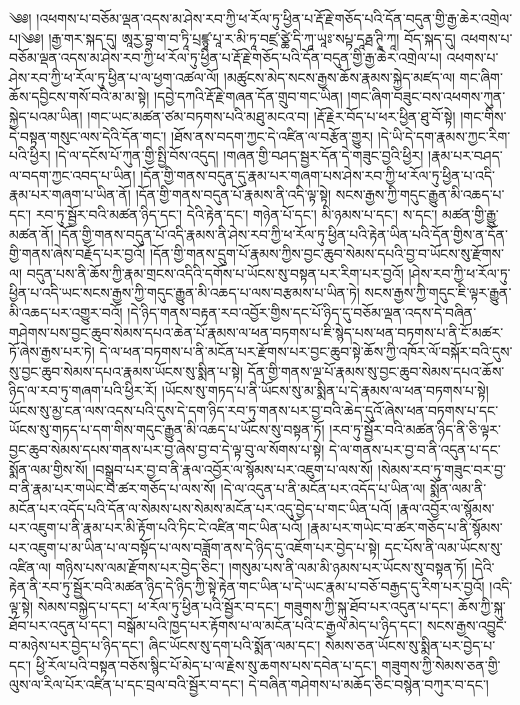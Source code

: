 \setcounter{footnote}{0} 
༄༅། །འཕགས་པ་བཅོམ་ལྡན་འདས་མ་ཤེས་རབ་ཀྱི་ཕ་རོལ་ཏུ་ཕྱིན་པ་རྡོ་རྗེ་གཅོད་པའི་དོན་བདུན་གྱི་རྒྱ་ཆེར་འགྲེལ་པ།༄༅། །རྒྱ་གར་སྐད་དུ། ཨཱརྱ་བྷ་ག་བ་ཏཱི་པྲཛྙཱ་པཱ་ར་མི་ཏཱ་བཛྲ་ཙྪེ་དི་ཀཱ་ཡཱཿ་སཔྟ་དཱརྠ་ཊཱི་ཀཱ། བོད་སྐད་དུ། འཕགས་པ་བཅོམ་ལྡན་འདས་མ་ཤེས་རབ་ཀྱི་ཕ་རོལ་ཏུ་ཕྱིན་པ་རྡོ་རྗེ་གཅོད་པའི་དོན་བདུན་གྱི་རྒྱ་ཆེར་འགྲེལ་པ། འཕགས་པ་ཤེས་རབ་ཀྱི་ཕ་རོལ་ཏུ་ཕྱིན་པ་ལ་ཕྱག་འཚལ་ལོ། །མཚུངས་མེད་སངས་རྒྱས་ཆོས་རྣམས་སྐྱེད་མཛད་ལ། གང་ཞིག་ཆོས་དབྱིངས་གསོ་བའི་མ་མ་སྟེ། །དབྱེ་དཀའི་རྡོ་རྗེ་གཞན་དོན་གྲུབ་གང་ཡིན། །གང་ཞིག་བཟུང་བས་འཕགས་ཀུན་སྐྱེད་པའམ་ཡིན། །གང་ཡང་མཚན་ཙམ་བཏགས་པའི་མཐུ་མངའ་བ། །རྡོ་རྗེར་བོད་པ་ཕར་ཕྱིན་ཐུ་བོ་སྟེ། །གང་གིས་དེ་བསྟན་གསུང་ལས་དེའི་དོན་གང་། །ཐོས་ནས་བདག་ཀྱང་དེ་འཛིན་ལ་བརྩོན་གྱུར། །དེ་ཡི་དེ་དག་རྣམས་ཀྱང་རིག་པའི་ཕྱིར། །དེ་ལ་དངོས་པོ་ཀུན་གྱི་སྤྱི་བོས་འདུད། །གཞན་གྱི་བཤད་སྦྱར་དོན་དེ་གཟུང་བྱའི་ཕྱིར། །རྣམ་པར་བཤད་ལ་བདག་ཀྱང་འབད་པ་ཡིན། །དོན་གྱི་གནས་བདུན་དུ་རྣམ་པར་གཞག་པས་ཤེས་རབ་ཀྱི་ཕ་རོལ་ཏུ་ཕྱིན་པ་འདི་རྣམ་པར་གཞག་པ་ཡིན་ནོ། །དོན་གྱི་གནས་བདུན་པོ་རྣམས་ནི་འདི་ལྟ་སྟེ། སངས་རྒྱས་ཀྱི་གདུང་རྒྱུན་མི་འཆད་པ་དང་། རབ་ཏུ་སྦྱོར་བའི་མཚན་ཉིད་དང་། དེའི་རྟེན་དང་། གཉེན་པོ་དང་། མི་ཉམས་པ་དང་། ས་དང་། མཚན་གྱི་རྒྱུ་མཚན་ནོ། །དོན་གྱི་གནས་བདུན་པོ་འདི་རྣམས་ནི་ཤེས་རབ་ཀྱི་ཕ་རོལ་ཏུ་ཕྱིན་པའི་རྟེན་ཡིན་པའི་དོན་གྱིས་ན་དོན་གྱི་གནས་ཞེས་བརྗོད་པར་བྱའོ། །དོན་གྱི་གནས་དྲུག་པོ་རྣམས་ཀྱིས་བྱང་ཆུབ་སེམས་དཔའི་བྱ་བ་ཡོངས་སུ་རྫོགས་ལ། བདུན་པས་ནི་ཆོས་ཀྱི་རྣམ་གྲངས་འདིའི་དགོས་པ་ཡོངས་སུ་བསྟན་པར་རིག་པར་བྱའོ། །ཤེས་རབ་ཀྱི་ཕ་རོལ་ཏུ་ཕྱིན་པ་འདི་ཡང་སངས་རྒྱས་ཀྱི་གདུང་རྒྱུན་མི་འཆད་པ་ལས་བརྩམས་པ་ཡིན་ཏེ། སངས་རྒྱས་ཀྱི་གདུང་ཇི་ལྟར་རྒྱུན་མི་འཆད་པར་འགྱུར་བའོ། །དེ་ཉིད་གནས་བརྟན་རབ་འབྱོར་གྱིས་དང་པོ་ཉིད་དུ་བཅོམ་ལྡན་འདས་དེ་བཞིན་གཤེགས་པས་བྱང་ཆུབ་སེམས་དཔའ་ཆེན་པོ་རྣམས་ལ་ཕན་བཏགས་པ་ཇི་སྙེད་པས་ཕན་བཏགས་པ་ནི་ངོ་མཚར་ཏོ་ཞེས་རྒྱས་པར་ཏེ། དེ་ལ་ཕན་བཏགས་པ་ནི་མངོན་པར་རྫོགས་པར་བྱང་ཆུབ་སྟེ་ཆོས་ཀྱི་འཁོར་ལོ་བསྐོར་བའི་དུས་སུ་བྱང་ཆུབ་སེམས་དཔའ་རྣམས་ཡོངས་སུ་སྨིན་པ་སྟེ། དོན་གྱི་གནས་ལྔ་པོ་རྣམས་སུ་བྱང་ཆུབ་སེམས་དཔའ་ཆོས་ཉིད་ལ་རབ་ཏུ་གཞག་པའི་ཕྱིར་རོ། །ཡོངས་སུ་གཏད་པ་ནི་ཡོངས་སུ་མ་སྨིན་པ་དེ་རྣམས་ལ་ཕན་བཏགས་པ་སྟེ། ཡོངས་སུ་མྱ་ངན་ལས་འདས་པའི་དུས་དེ་དག་ཉིད་རབ་ཏུ་གནས་པར་བྱ་བའི་ཆེད་དུའོ་ཞེས་ཕན་བཏགས་པ་དང་ཡོངས་སུ་གཏད་པ་དག་གིས་གདུང་རྒྱུན་མི་འཆད་པ་ཡོངས་སུ་བསྟན་ཏོ། །རབ་ཏུ་སྦྱོར་བའི་མཚན་ཉིད་ནི་ཅི་ལྟར་བྱང་ཆུབ་སེམས་དཔས་གནས་པར་བྱ་ཞེས་བྱ་བ་དེ་ལྟ་བུ་ལ་སོགས་པ་སྟེ། དེ་ལ་གནས་པར་བྱ་བ་ནི་འདུན་པ་དང་སྨོན་ལམ་གྱིས་སོ། །བསྒྲུབ་པར་བྱ་བ་ནི་རྣལ་འབྱོར་ལ་སྙོམས་པར་འཇུག་པ་ལས་སོ། །སེམས་རབ་ཏུ་གཟུང་བར་བྱ་བ་ནི་རྣམ་པར་གཡེང་བ་ཚར་གཅོད་པ་ལས་སོ། །དེ་ལ་འདུན་པ་ནི་མངོན་པར་འདོད་པ་ཡིན་ལ། སྨོན་ལམ་ནི་མངོན་པར་འདོད་པའི་དོན་ལ་སེམས་པས་སེམས་མངོན་པར་འདུ་བྱེད་པ་གང་ཡིན་པའོ། །རྣལ་འབྱོར་ལ་སྙོམས་པར་འཇུག་པ་ནི་རྣམ་པར་མི་རྟོག་པའི་ཏིང་ངེ་འཛིན་གང་ཡིན་པའོ། །རྣམ་པར་གཡེང་བ་ཚར་གཅོད་པ་ནི་སྙོམས་པར་འཇུག་པ་མ་ཡིན་པ་ལ་བསྟོད་པ་ལས་བཟློག་ནས་དེ་ཉིད་དུ་འཇོག་པར་བྱེད་པ་སྟེ། དང་པོས་ནི་ལམ་ཡོངས་སུ་འཛིན་ལ། གཉིས་པས་ལམ་རྫོགས་པར་བྱེད་ཅིང་། །གསུམ་པས་ནི་ལམ་མི་ཉམས་པར་ཡོངས་སུ་བསྟན་ཏོ། །དེའི་རྟེན་ནི་རབ་ཏུ་སྦྱོར་བའི་མཚན་ཉིད་དེ་ཉིད་ཀྱི་སྟེ་རྟེན་གང་ཡིན་པ་དེ་ཡང་རྣམ་པ་བཅོ་བརྒྱད་དུ་རིག་པར་བྱའོ། །འདི་ལྟ་སྟེ། སེམས་བསྐྱེད་པ་དང་། ཕ་རོལ་ཏུ་ཕྱིན་པའི་སྦྱོར་བ་དང་། གཟུགས་ཀྱི་སྐུ་ཐོབ་པར་འདུན་པ་དང་། ཆོས་ཀྱི་སྐུ་ཐོབ་པར་འདུན་པ་དང་། བསྒོམ་པའི་ཁྱད་པར་རྟོགས་པ་ལ་མངོན་པའི་ང་རྒྱལ་མེད་པ་ཉིད་དང་། སངས་རྒྱས་འབྱུང་བ་མཉེས་པར་བྱེད་པ་ཉིད་དང་། ཞིང་ཡོངས་སུ་དག་པའི་སྨོན་ལམ་དང་། སེམས་ཅན་ཡོངས་སུ་སྨིན་པར་བྱེད་པ་དང་། ཕྱི་རོལ་པའི་བསྟན་བཅོས་སྙིང་པོ་མེད་པ་ལ་རྗེས་སུ་ཆགས་པས་དབེན་པ་དང་། གཟུགས་ཀྱི་སེམས་ཅན་གྱི་ལུས་ལ་རིལ་པོར་འཛིན་པ་དང་བྲལ་བའི་སྦྱོར་བ་དང་། དེ་བཞིན་གཤེགས་པ་མཆོད་ཅིང་བསྙེན་བཀུར་བ་དང་། 